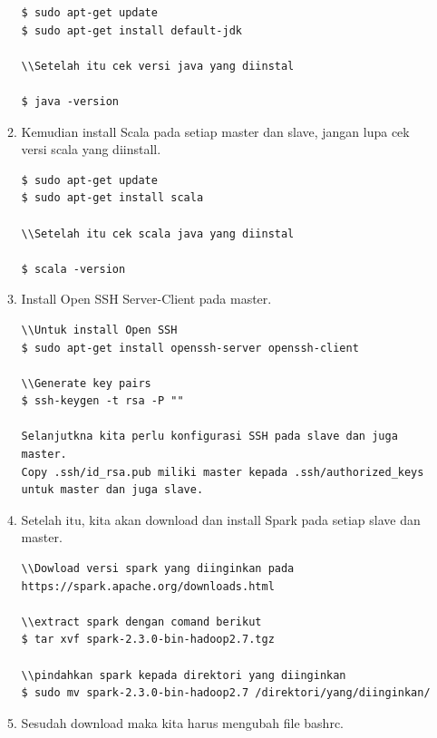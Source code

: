 \documentclass[a4paper,twoside]{article}
\begin{document}
\begin{enumerate}
\begin{enumerate}
\begin{verbatim}
$ sudo apt-get update
$ sudo apt-get install default-jdk

\\Setelah itu cek versi java yang diinstal

$ java -version
\end{verbatim}

\item Kemudian install Scala pada setiap master dan slave, jangan lupa cek versi scala yang diinstall.

\begin{verbatim}
$ sudo apt-get update
$ sudo apt-get install scala

\\Setelah itu cek scala java yang diinstal

$ scala -version
\end{verbatim}

\item Install Open SSH Server-Client pada master.

\begin{verbatim}
\\Untuk install Open SSH
$ sudo apt-get install openssh-server openssh-client

\\Generate key pairs
$ ssh-keygen -t rsa -P ""

Selanjutkna kita perlu konfigurasi SSH pada slave dan juga master. 
Copy .ssh/id_rsa.pub miliki master kepada .ssh/authorized_keys untuk master dan juga slave.
\end{verbatim}



\item Setelah itu, kita akan download dan install Spark pada setiap slave dan master.

\begin{verbatim}
\\Dowload versi spark yang diinginkan pada 
https://spark.apache.org/downloads.html

\\extract spark dengan comand berikut
$ tar xvf spark-2.3.0-bin-hadoop2.7.tgz

\\pindahkan spark kepada direktori yang diinginkan
$ sudo mv spark-2.3.0-bin-hadoop2.7 /direktori/yang/diinginkan/
\end{verbatim}

\item Sesudah download maka kita harus mengubah file bashrc.


\end{enumerate}
\end{enumerate}
\end{document}
